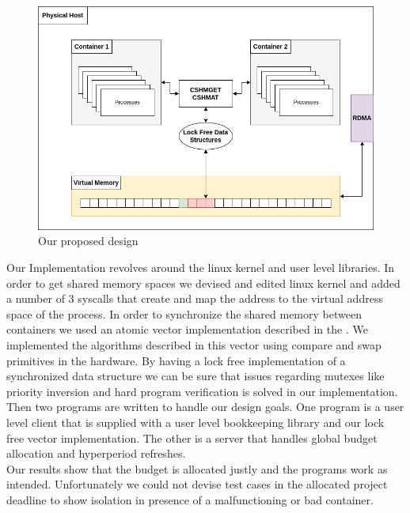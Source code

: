 \documentclass[a4paper, 10pt]{article}
\theoremstyle{nonumberplain}
\begin{document}
\begin{figure}[H]
    \centering
    \includegraphics[scale=0.3]{dist.png}
    \caption{Our proposed design}
\end{figure}

Our Implementation revolves around the linux kernel and user level libraries.
In order to get shared memory spaces we devised and edited linux kernel
and added a number of 3 syscalls that create and map the address to the
virtual address space of the process. In order to synchronize the shared memory
between containers we used an atomic vector implementation described in the
\cite{vector}. We implemented the algorithms described in this vector using
compare and swap primitives in the hardware. By having a lock free
implementation of a synchronized data structure we can be sure that issues
regarding mutexes like priority inversion and hard program verification is
solved in our implementation. \\
Then two programs are written to handle our design goals. One program is a user
level client that is supplied with a user level bookkeeping library and our
lock free vector implementation. The other is a server that handles global
budget allocation and hyperperiod refreshes. \\
Our results show that the budget is allocated justly and the programs work as
intended. Unfortunately we could not devise test cases in the allocated
project deadline to show isolation in presence of a malfunctioning or
bad container.
\end{document}
